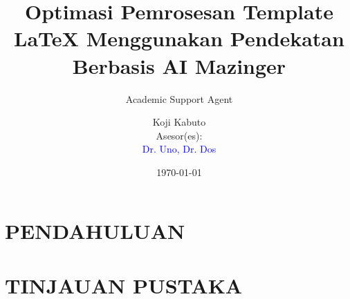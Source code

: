 \documentclass{article}
\title{Optimasi Pemrosesan Template LaTeX Menggunakan Pendekatan Berbasis AI}
\author{Academic Support Agent}
\date{\today}
\begin{document}
\maketitle

\begin{abstract}

\end{abstract}

\chapter{PENDAHULUAN}


\chapter{TINJAUAN PUSTAKA}


\usepackage{macros-ohp}
\usepackage{wrapfig}

\renewcommand{\contentsname}{Índice Temático}


\renewcommand{\figurename}{Figura}
\renewcommand{\listfigurename}{Índice de Figuras}

\renewcommand{\tablename}{Tabla}


\title{\Huge \textbf{ \textcolor{blk}{Mazinger}}}

\author{\Huge \textcolor{blk}{Koji Kabuto}\\[1cm]
	\Large \textcolor{blk}{Asesor(es):}\\[1cm]
	\Large \textcolor{blue}{ Dr. Uno, Dr. Dos }\\
}

\linespread{1.5}
\end{document}
